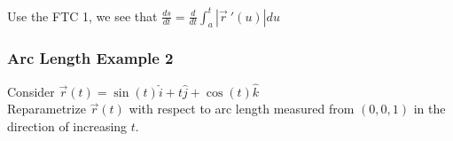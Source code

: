 \documentclass[12pt]{article}
\begin{document}
Use the FTC 1, we see that \(\frac{ds}{dt}= \frac{d}{dt}\int_{a}^{t} |\vec{r}\ '(u) |du\) 

\subsubsection{Arc Length Example 2}
Consider \(\vec{r} (t) = \sin(t) \hat{i} + t\hat{j} + \cos(t)\hat{k}\) \\%
Reparametrize \(\vec{r} (t) \) with respect to arc length measured from \((0,0,1)\) in the direction of increasing \(t\). 
\end{document}
